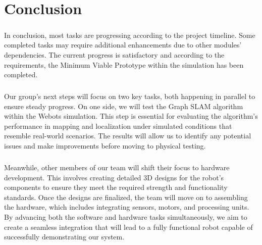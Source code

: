 \chapter{Conclusion}

\paragraph*{}
In conclusion, most tasks are progressing according to the project timeline. Some completed tasks may require additional enhancements due to other modules' dependencies. The current progress is satisfactory and according to the requirements, the Minimum Viable Prototype within the simulation has been completed.

\paragraph*{}
Our group’s next steps will focus on two key tasks, both happening in parallel to ensure steady progress. On one side, we will test the Graph SLAM algorithm within the Webots simulation. This step is essential for evaluating the algorithm's performance in mapping and localization under simulated conditions that resemble real-world scenarios. The results will allow us to identify any potential issues and make improvements before moving to physical testing.

\paragraph*{}
Meanwhile, other members of our team will shift their focus to hardware development. This involves creating detailed 3D designs for the robot’s components to ensure they meet the required strength and functionality standards. Once the designs are finalized, the team will move on to assembling the hardware, which includes integrating sensors, motors, and processing units. By advancing both the software and hardware tasks simultaneously, we aim to create a seamless integration that will lead to a fully functional robot capable of successfully demonstrating our system.
